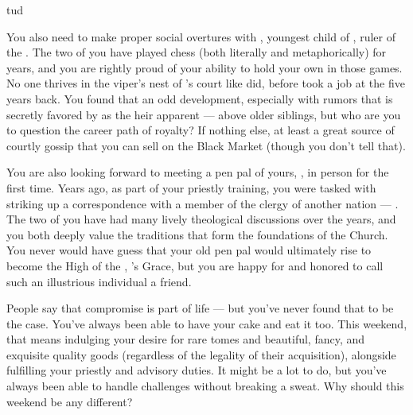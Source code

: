 tud\documentclass[char]{GL2020}
\begin{document}
You also need to make proper social overtures with \cPrince{\full}, youngest child of \cQueen{\full}, ruler of the \pFarm{}. The two of you have played chess (both literally and metaphorically) for years, and you are rightly proud of your ability to hold your own in those games. No one thrives in the viper’s nest of \cQueen{}’s court like \cPrince{} did, before \cPrince{} took a job at the \pSchool{} five years back. You found that an odd development, especially with rumors that \cPrince{} is secretly favored by \cQueen{} as the heir apparent — above \cPrince{\their} older siblings, but who are you to question the career path of royalty? If nothing else, at least \cPrince{\theyare} a great source of courtly gossip that you can sell on the Black Market (though you don't tell \cPrince{\them} that). 

You are also looking forward to meeting a pen pal of yours, \cAntiChup{\full}, in person for the first time. Years ago, as part of your priestly training, you were tasked with striking up a correspondence with a member of the clergy of another nation — \cAntiChup{}. The two of you have had many lively theological discussions over the years, and you both deeply value the traditions that form the foundations of the Church. You never would have guess that your old pen pal would ultimately rise to become the High \cAntiChup{\Cleric} of the \pTech{}, \cTechGod{}’s Grace, but you are happy for \cAntiChup{\them} and honored to call such an illustrious individual a friend.

People say that compromise is part of life — but you've never found that to be the case. You've always been able to have your cake and eat it too. This weekend, that means indulging your desire for rare tomes and beautiful, fancy, and exquisite quality goods (regardless of the legality of their acquisition), alongside fulfilling your priestly and advisory duties. It might be a lot to do, but you've always been able to handle challenges without breaking a sweat. Why should this weekend be any different?
\end{document}
